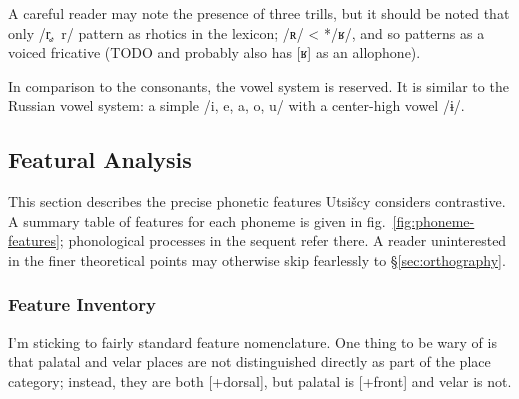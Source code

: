 \documentclass[12pt]{book} %
\begin{document}
A careful reader may note the presence of three trills, but it should be noted that only /r̥,~r/ pattern as rhotics in the lexicon; /ʀ/ < */ʁ/, and so patterns as a voiced fricative (TODO and probably also has [ʁ] as an allophone).

In comparison to the consonants, the vowel system is reserved.
It is similar to the Russian vowel system: a simple /i, e, a, o, u/ with a center-high vowel /ɨ/.

\subsection{Featural Analysis}

This section describes the precise phonetic features Utsišcy considers contrastive.
A summary table of features for each phoneme is given in fig.\ \ref{fig:phoneme-features}; phonological processes in the sequent refer there.
A reader uninterested in the finer theoretical points may otherwise skip fearlessly to \S\ref{sec:orthography}.

\subsubsection{Feature Inventory}

I'm sticking to fairly standard feature nomenclature.
One thing to be wary of is that palatal and velar places are not distinguished directly as part of the place category; instead, they are both [+dorsal], but palatal is [+front] and velar is not.
\end{document}
